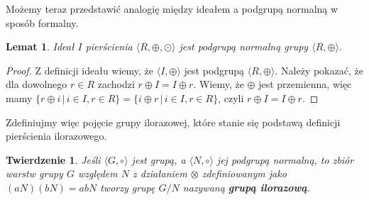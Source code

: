 \documentclass[polish,declaration,shortabstract]{iithesis}
\theoremstyle{definition}
\theoremstyle{remark} \newtheorem{observation}{Obserwacja}
\theoremstyle{plain} \newtheorem{theorem}{Twierdzenie}
\theoremstyle{plain} \newtheorem{lemma}{Lemat}
\theoremstyle{remark} \newtheorem*{remark*}{Uwaga}
\theoremstyle{reminder} \newtheorem*{reminder*}{Przypomnienie}
\begin{document}
Możemy teraz przedstawić analogię między ideałem a podgrupą normalną w sposób formalny.

\begin{lemma}
	Ideał $I$ pierścienia $\langle R, \oplus, \odot \rangle$ jest podgrupą normalną grupy $\langle R, \oplus \rangle$.
\end{lemma}

\begin{proof}
	Z definicji ideału wiemy, że $\langle I, \oplus \rangle$ jest podgrupą $\langle R, \oplus \rangle$. \newline
	Należy pokazać, że dla dowolnego $r \in R$ zachodzi $r \oplus I = I \oplus r$. Wiemy, że $\oplus$ jest przemienna, więc mamy ${\{r \oplus i \, | \, i \in I, r \in R\}} = {\{i \oplus r \, | \, i \in I, r \in R\}}$, czyli $r \oplus I = I \oplus r$.
\end{proof}

Zdefiniujmy więc pojęcie grupy ilorazowej, które stanie się podstawą definicji pierścienia ilorazowego.

\theoremstyle{theorem}\label{grup_ilo}
\begin{theorem}
	Jeśli $\langle G, \circ \rangle$ jest grupą, a $\langle N, \circ \rangle$ jej podgrupą normalną, to zbiór warstw grupy $G$ względem $N$ z działaniem $\otimes$ zdefiniowanym jako $(aN)(bN) = abN$ tworzy grupę $G/N$ nazywaną \textbf{\textit{grupą ilorazową}}.
\end{theorem}
\end{document}

